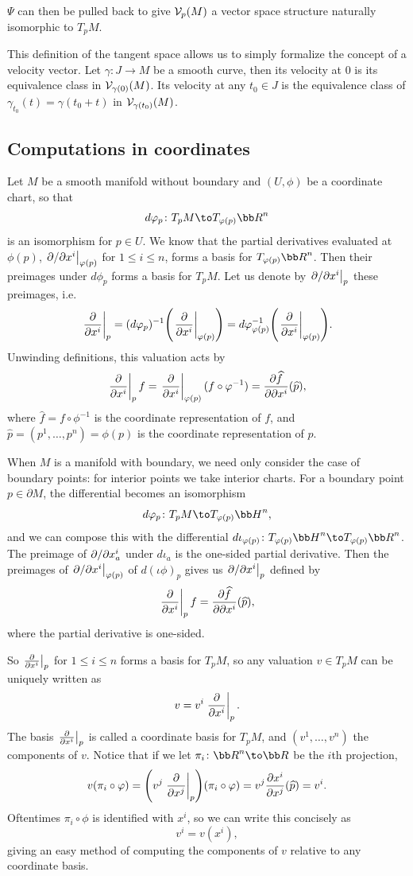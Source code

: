 \eproof

$\Psi$ can then be pulled back to give ${{\cal V}}_p(M)$ a vector space structure naturally isomorphic to $T_pM$.

This definition of the tangent space allows us to simply formalize the concept of a {\emphcolor velocity vector}.
Let $\gamma\colon J\to M$ be a smooth curve, then its velocity at $0$ is its equivalence class in ${{\cal V}}_{\gamma(0)}(M)$.
Its velocity at any $t_0\in J$ is the equivalence class of $\gamma_{t_0}(t)=\gamma(t_0+t)$ in ${{\cal V}}_{\gamma(t_0)}(M)$.

\subsection{Computations in coordinates}

Let $M$ be a smooth manifold without boundary and $(U,\phi)$ be a coordinate chart, so that
$$ d\phi_p\colon T_pM \to T_{\phi(p)}\bR^n $$
is an isomorphism for $p\in U$.
We know that the partial derivatives evaluated at $\phi(p)$, $\left.\partial/\partial x^i\right|_{\varphi(p)}$ for $1\leq i\leq n$, forms a basis for $T_{\phi(p)}\bR^n$.
Then their preimages under $d\phi_p$ forms a basis for $T_pM$.
Let us denote by $\left.\partial /\partial x^i\right|_p$ these preimages, i.e.
$$ \left.{{\partial }\over{\partial x^i}}\right|_p = (d\varphi_p)^{-1}\mathopen{}\mathclose{\left(\left.{{\partial }\over{\partial x^i}}\right|_{\varphi(p)}\right)} = d\varphi^{-1}_{\varphi(p)}\mathopen{}\mathclose{\left(\left.{{\partial }\over{\partial x^i}}\right|_{\varphi(p)}\right)} . $$
Unwinding definitions, this valuation acts by
$$ \left.{{\partial }\over{\partial x^i}}\right|_pf = \left.{{\partial }\over{\partial x^i}}\right|_{\varphi(p)}(f\circ\varphi^{-1}) = {{\partial \widehat f}\over{\partial \partial x^i}}(\widehat p) , $$
where $\hat f=f\circ\phi^{-1}$ is the coordinate representation of $f$, and $\hat p=(p^1,\dots,p^n)=\phi(p)$ is the coordinate representation of $p$.

When $M$ is a manifold with boundary, we need only consider the case of boundary points: for interior points we take interior charts.
For a boundary point $p\in\partial M$, the differential becomes an isomorphism
$$ d\phi_p\colon T_pM \to T_{\phi(p)}\bH^n , $$
and we can compose this with the differential $d\iota_{\phi(p)}\colon T_{\phi(p)}\bH^n\to T_{\phi(p)}\bR^n$.
The preimage of $\partial /\partial x^i_a$ under $d\iota_a$ is the one-sided partial derivative.
Then the preimages of $\left.\partial /\partial x^i\right|_{\varphi(p)}$ of $d(\iota\phi)_p$ gives us $\left.\partial /\partial x^i\right|_p$ defined by
$$ \left.{{\partial }\over{\partial x^i}}\right|_pf = {{\partial \widehat f}\over{\partial \partial x^i}}(\widehat p) , $$
where the partial derivative is one-sided.

So $\left.{{\partial }\over{\partial x^i}}\right|_p$ for $1\leq i\leq n$ forms a basis for $T_pM$, so any valuation $v\in T_pM$ can be uniquely written as
$$ v = v^i\left.{{\partial }\over{\partial x^i}}\right|_p . $$
The basis $\left.{{\partial }\over{\partial x^i}}\right|_p$ is called a {\emphcolor coordinate basis} for $T_pM$, and $(v^1,\dots,v^n)$ the {\emphcolor components} of $v$.
Notice that if we let $\pi_i\colon\bR^n\to\bR$ be the $i$th projection,
$$ v(\pi_i\circ\varphi) = \mathopen{}\mathclose{\left(v^j\left.{{\partial }\over{\partial x^j}}\right|_p\right)}(\pi_i\circ\varphi) = v^j{{\partial x^i}\over{\partial x^j}}(\widehat p) = v^i . $$
Oftentimes $\pi_i\circ\phi$ is identified with $x^i$, so we can write this concisely as
$$ v^i = v(x^i) , $$
giving an easy method of computing the components of $v$ relative to any coordinate basis.

